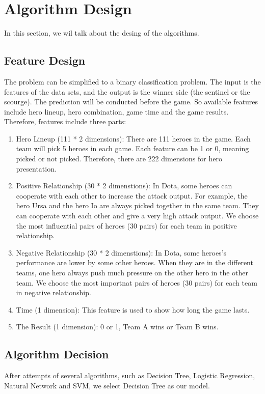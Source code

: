 \section{Algorithm Design}
In this section, we wil talk about the desing of the algorithms.
\subsection{Feature Design}
The problem can be simplified to a binary classification problem.
The input is the features of the data sets, and the output is the winner side (the sentinel or the scourge).
The prediction will be conducted before the game.
So available features include hero lineup, hero combination, game time and the game results.
Therefore, features include three parts: 
\begin{enumerate}
\item Hero Lineup (111 * 2 dimensions): There are 111 heroes in the game.
Each team will pick 5 heroes in each game.
Each feature can be 1 or 0, meaning picked or not picked.
Therefore, there are 222 dimensions for hero presentation.
\item Positive Relationship (30 * 2 dimenstions):
In Dota, some heroes can cooperate with each other to increase the attack output.
For example, the hero Ursa and the hero Io are always picked together in the same team.
They can cooperate with each other and give a very high attack output.
We choose the most influential pairs of heroes (30 pairs) for each team in positive relationship.
\item Negative Relationship (30 * 2 dimenstions):
In Dota, some heroes's performance are lower by some other heroes.
When they are in the different teams, one hero always push much pressure on the other hero in the other team.
We choose the most importnat pairs of heroes (30 pairs) for each team in negative relationship.
\item Time (1 dimension):
This feature is used to show how long the game lasts.
\item The Result (1 dimension): 0 or 1, Team A wins or Team B wins.
\end{enumerate}
\subsection{Algorithm Decision}

After attempts of several algorithms, such as Decision Tree, Logistic Regression, Natural Network and SVM, we select Decision Tree as our model.
 

